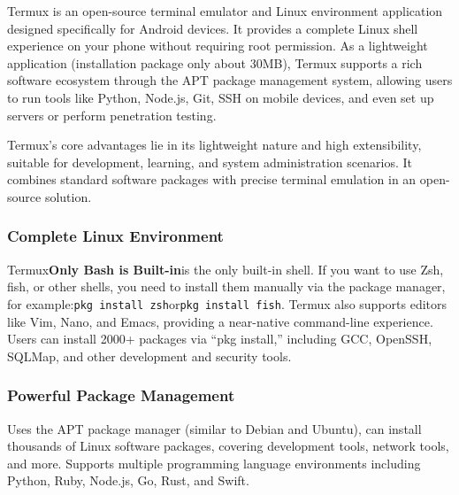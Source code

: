 


Termux is an open-source terminal emulator and Linux environment application designed specifically for Android devices. It provides a complete Linux shell experience on your phone without requiring root permission. As a lightweight application (installation package only about 30MB), Termux supports a rich software ecosystem through the APT package management system, allowing users to run tools like Python, Node.js, Git, SSH on mobile devices, and even set up servers or perform penetration testing.

Termux's core advantages lie in its lightweight nature and high extensibility, suitable for development, learning, and system administration scenarios. It combines standard software packages with precise terminal emulation in an open-source solution.


\subsubsection*{Complete Linux Environment}

Termux\textbf{Only Bash is Built-in}is the only built-in shell. If you want to use Zsh, fish, or other shells, you need to install them manually via the package manager, for example:\texttt{pkg install zsh}or\texttt{pkg install fish}. Termux also supports editors like Vim, Nano, and Emacs, providing a near-native command-line experience. Users can install 2000+ packages via “pkg install,” including GCC, OpenSSH, SQLMap, and other development and security tools.

\subsubsection*{Powerful Package Management}

Uses the APT package manager (similar to Debian and Ubuntu), can install thousands of Linux software packages, covering development tools, network tools, and more. Supports multiple programming language environments including Python, Ruby, Node.js, Go, Rust, and Swift.

